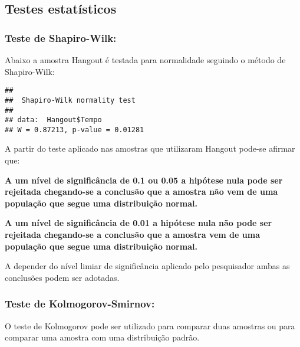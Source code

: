 \documentclass[
]{article}
\newenvironment{Shaded}{\begin{snugshade}}{\end{snugshade}}
\newcommand{\KeywordTok}[1]{\textcolor[rgb]{0.13,0.29,0.53}{\textbf{#1}}}
\newcommand{\NormalTok}[1]{#1}
\newcommand{\OperatorTok}[1]{\textcolor[rgb]{0.81,0.36,0.00}{\textbf{#1}}}
\newcommand{\StringTok}[1]{\textcolor[rgb]{0.31,0.60,0.02}{#1}}
\begin{document}
\hypertarget{testes-estatuxedsticos-1}{%
\subsection{Testes estatísticos}\label{testes-estatuxedsticos-1}}

\hypertarget{teste-de-shapiro-wilk-1}{%
\subsubsection{Teste de Shapiro-Wilk:}\label{teste-de-shapiro-wilk-1}}

Abaixo a amostra Hangout é testada para normalidade seguindo o método de
Shapiro-Wilk:

\begin{Shaded}
\end{Shaded}

\begin{verbatim}
## 
##  Shapiro-Wilk normality test
## 
## data:  Hangout$Tempo
## W = 0.87213, p-value = 0.01281
\end{verbatim}

A partir do teste aplicado nas amostras que utilizaram Hangout pode-se
afirmar que:

\textbf{A um nível de significância de 0.1 ou 0.05 a hipótese nula pode
ser rejeitada chegando-se a conclusão que a amostra não vem de uma
população que segue uma distribuição normal.}

\textbf{A um nível de significância de 0.01 a hipótese nula não pode ser
rejeitada chegando-se a conclusão que a amostra vem de uma população que
segue uma distribuição normal.}

A depender do nível limiar de significância aplicado pelo pesquisador
ambas as conclusões podem ser adotadas.

\hypertarget{teste-de-kolmogorov-smirnov-1}{%
\subsubsection{Teste de
Kolmogorov-Smirnov:}\label{teste-de-kolmogorov-smirnov-1}}

O teste de Kolmogorov pode ser utilizado para comparar duas amostras ou
para comparar uma amostra com uma distribuição padrão.
\end{document}

